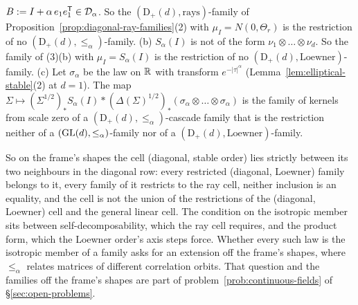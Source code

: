 \begin{proposition}
\begin{enumerate}
$B := I + \alpha\,e_1e_1^{\mathsf{T}} \in \mathcal D_\alpha$. So the $(\mathrm D_+(d), \text{rays})$-family of
Proposition~\ref{prop:diagonal-ray-families}(2) with $\mu_I = N(0, \Theta_r)$ is the restriction of no
$(\mathrm D_+(d), \le_\alpha)$-family.
(b) $S_\alpha(I)$ is not of the form $\nu_1 \otimes \dots \otimes \nu_d$. So the family of (3)(b) with
$\mu_I = S_\alpha(I)$ is the restriction of no $(\mathrm D_+(d), \text{Loewner})$-family.
(c) Let $\sigma_\alpha$ be the law on $\mathbb{R}$ with transform $e^{-|\tau|^\alpha}$ (Lemma~\ref{lem:elliptical-stable}(2)
at $d = 1$). The map $\Sigma \mapsto (\Sigma^{1/2})_*S_\alpha(I) * (\Delta(\Sigma)^{1/2})_*(\sigma_\alpha
\otimes \dots \otimes \sigma_\alpha)$ is the family of kernels from scale zero of a
$(\mathrm D_+(d), \le_\alpha)$-cascade family that is the restriction neither of a
$(\mathrm{GL}(d), \le_\alpha)$-family nor of a $(\mathrm D_+(d), \text{Loewner})$-family.
\end{enumerate}
\end{proposition}

So on the frame's shapes the cell (diagonal, stable order) lies strictly between its two neighbours in
the diagonal row: every restricted (diagonal, Loewner) family belongs to it, every family of it
restricts to the ray cell, neither inclusion is an equality, and the cell is not the union of the
restrictions of the (diagonal, Loewner) cell and the general linear cell. The condition on the isotropic
member sits between self-decomposability, which the ray cell requires, and the product form, which the
Loewner order's axis steps force.
Whether every such law is the isotropic member of a family asks for an extension off the frame's
shapes, where $\le_\alpha$ relates matrices of different correlation orbits. That question and the
families off the frame's shapes are part of problem~\ref{prob:continuous-fields} of
\S\ref{sec:open-problems}.

